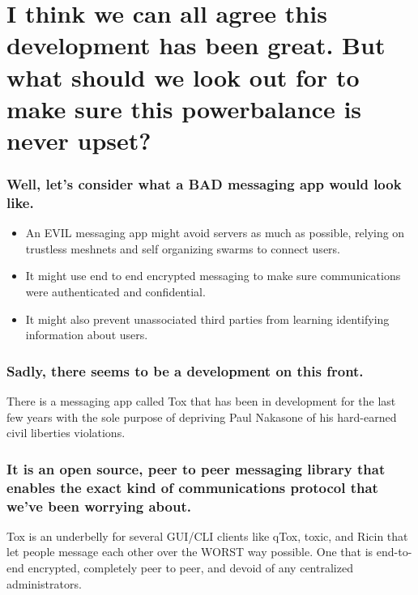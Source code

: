 \documentclass{beamer}
\begin{document}
  \section{I think we can all agree this development has been great. But what should we look out for to make sure this powerbalance is never upset?}
  \begin{frame}
      \frame{\sectionpage}
  \end{frame}
  \begin{frame}
      \frametitle{Well, let's consider what a BAD messaging app would look like.}
      \begin{itemize}
          \item An EVIL messaging app might avoid servers as much as possible, relying on trustless meshnets and self organizing swarms to connect users.
          \item It might use end to end encrypted messaging to make sure communications were authenticated and confidential.
          \item It might also prevent unassociated third parties from learning identifying information about users.
      \end{itemize}
  \end{frame}
  \begin{frame}
      \frametitle{Sadly, there seems to be a development on this front.}
      There is a messaging app called Tox that has been in development for the last few years with the sole
      purpose of depriving Paul Nakasone of his hard-earned civil liberties violations.
  \end{frame}
  \begin{frame}
      \frametitle{It is an open source, peer to peer messaging library that enables the exact kind of communications protocol that we've been worrying about.}
      Tox is an underbelly for several GUI/CLI clients like qTox, toxic, and Ricin that let people message each other over the
      WORST way possible. One that is end-to-end encrypted, completely peer to peer, and devoid of any centralized administrators.
  \end{frame}
\end{document}
